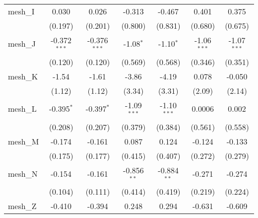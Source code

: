 \begin{tabular}{lcccccc}
   mesh\_I                                                     & 0.030          & 0.026          & -0.313         & -0.467         & 0.401          & 0.375\\   
                                                               & (0.197)        & (0.201)        & (0.800)        & (0.831)        & (0.680)        & (0.675)\\   
   mesh\_J                                                     & -0.372$^{***}$ & -0.376$^{***}$ & -1.08$^{*}$    & -1.10$^{*}$    & -1.06$^{***}$  & -1.07$^{***}$\\   
                                                               & (0.120)        & (0.120)        & (0.569)        & (0.568)        & (0.346)        & (0.351)\\   
   mesh\_K                                                     & -1.54          & -1.61          & -3.86          & -4.19          & 0.078          & -0.050\\   
                                                               & (1.12)         & (1.12)         & (3.34)         & (3.31)         & (2.09)         & (2.14)\\   
   mesh\_L                                                     & -0.395$^{*}$   & -0.397$^{*}$   & -1.09$^{***}$  & -1.10$^{***}$  & 0.0006         & 0.002\\   
                                                               & (0.208)        & (0.207)        & (0.379)        & (0.384)        & (0.561)        & (0.558)\\   
   mesh\_M                                                     & -0.174         & -0.161         & 0.087          & 0.124          & -0.124         & -0.133\\   
                                                               & (0.175)        & (0.177)        & (0.415)        & (0.407)        & (0.272)        & (0.279)\\   
   mesh\_N                                                     & -0.154         & -0.161         & -0.856$^{**}$  & -0.884$^{**}$  & -0.271         & -0.274\\   
                                                               & (0.104)        & (0.111)        & (0.414)        & (0.419)        & (0.219)        & (0.224)\\   
   mesh\_Z                                                     & -0.410         & -0.394         & 0.248          & 0.294          & -0.631         & -0.609\\   

\end{tabular}
